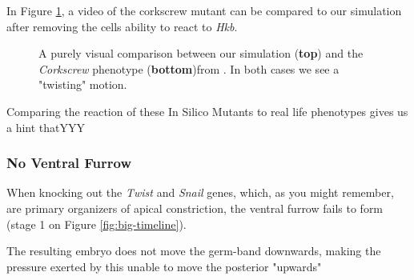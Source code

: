 In Figure \ref{fig:corkscrew-comparison}, a video of the corkscrew mutant can be compared to our simulation after removing the cells ability to react to \textit{Hkb}.

 
\begin{figure}[H]
    \centering
    \caption{A purely visual comparison between our simulation (\textbf{top}) and the \textit{Corkscrew} phenotype (\textbf{bottom})from . In both cases we see a "twisting" motion.}
    \label{fig:corkscrew-comparison}
\end{figure}

Comparing the reaction of these In Silico Mutants to real life phenotypes gives us a hint thatYYY

\subsubsection{No Ventral Furrow}
When knocking out the \textit{Twist} and \textit{Snail} genes, which, as you might remember, are primary organizers of apical constriction, the ventral furrow fails to form (stage 1 on Figure \ref{fig:big-timeline}).

The resulting embryo does not move the germ-band downwards, making the pressure exerted by this unable to move the posterior "upwards" 



